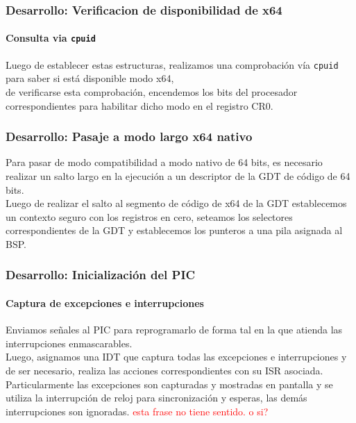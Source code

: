 \documentclass{beamer}
\begin{document}
\begin{frame}
  \frametitle{Desarrollo: Verificacion de disponibilidad de x64}
  \framesubtitle{Consulta via \texttt{cpuid}}
  Luego de establecer estas estructuras, realizamos una comprobación vía \texttt{cpuid} para saber si está disponible modo x64, \\ 
  \vspace{20pt}
  de verificarse esta comprobación, encendemos los bits del procesador correspondientes para habilitar dicho modo en el registro CR0.
\end{frame}

\begin{frame}
  \frametitle{Desarrollo: Pasaje a modo largo x64 nativo}
  Para pasar de modo compatibilidad a modo nativo de 64 bits, es necesario realizar un salto largo en la ejecución a un descriptor de la GDT de código de 64 bits.\\
  \vspace{20pt}
  Luego de realizar el salto al segmento de código de x64 de la GDT establecemos un contexto seguro con los registros en cero, seteamos los selectores correspondientes de la GDT y establecemos los punteros a una pila asignada al BSP.
\end{frame}

\begin{frame}
  \frametitle{Desarrollo: Inicialización del PIC}
  \framesubtitle{Captura de excepciones e interrupciones}
  Enviamos señales al PIC para reprogramarlo de forma tal en la que atienda las interrupciones enmascarables.\\
  \vspace{20pt}
  Luego, asignamos una IDT que captura todas las excepciones e interrupciones y de ser necesario, realiza las acciones correspondientes con su ISR asociada.\\
  \vspace{20pt}
  Particularmente las excepciones son capturadas y mostradas en pantalla y se utiliza la interrupción de reloj para sincronización y esperas, las demás interrupciones son ignoradas. \huge \textcolor{red}{esta frase no tiene sentido. o si?}
\end{frame}
\end{document}
